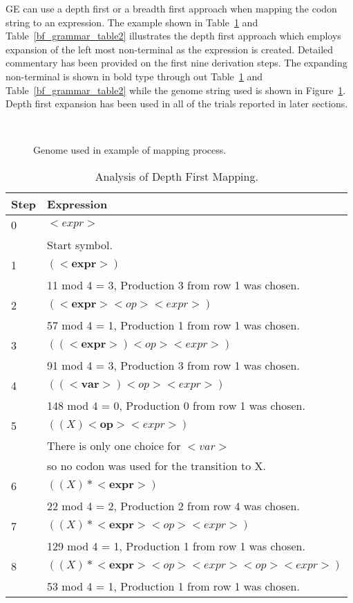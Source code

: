 GE can use a depth first or a breadth first approach when mapping the codon string to an expression. The example shown in Table~\ref{bf_grammar_table1} and Table~\ref{bf_grammar_table2} illustrates the depth first approach which employs expansion of the left most non-terminal as the expression is created. Detailed commentary has been provided on the first nine derivation steps. The expanding non-terminal is shown in bold type through out Table~\ref{bf_grammar_table1} and Table~\ref{bf_grammar_table2} while the genome string used is shown in Figure~\ref{genome1}. Depth first expansion has been used in all of the trials reported in later sections.

\begin{figure}[!hbp]
\centerline{\hbox{
}}
\caption{\label{genome1}Genome used in example of mapping process.}
\end{figure}


\begin{table}[!hbp]
\begin{center}
\begin{tabular}{|l|l|}
\hline
Step & Expression \\
\hline
0 & $ <expr>$ \\ 
  &     Start symbol. \\     
\hline
1 & $ ( \mathbf{<expr>} )$ \\ 
  &    11 mod 4 = 3, Production 3 from row 1 was chosen. \\
\hline
2 & $ ( \mathbf{<expr>} <op> <expr> )$ \\
  &    57 mod 4 = 1, Production 1 from row 1 was chosen. \\
\hline
3 & $ (( \mathbf{<expr>}) <op> <expr> )$  \\
  &    91 mod 4 = 3, Production 3 from row 1 was chosen. \\    
\hline
4 & $ ((\mathbf{<var>}) <op> <expr> )$ \\ 
  &   148 mod 4 = 0, Production 0 from row 1 was chosen. \\
\hline
5 & $ (( X ) \mathbf{<op>} <expr> )$  \\
  & There is only one choice for $<var>$ \\ 
  & so no codon was used for the transition to X. \\
\hline
6 & $ (( X ) * \mathbf{<expr>} )$ \\
  &  22 mod 4 = 2, Production 2 from row 4 was chosen. \\
\hline
7 & $ (( X ) * \mathbf{<expr>} <op> <expr> )$ \\
  &  129 mod 4 = 1, Production 1 from row 1 was chosen. \\ 
\hline
8 & $ (( X ) * \mathbf{<expr>} <op> <expr> <op> <expr> )$ \\
  & 53 mod 4 = 1, Production 1 from row 1 was chosen. \\
\hline
\hline
\end{tabular}
\caption{\label{bf_grammar_table1}Analysis of Depth First Mapping.}
\end{center}
\end{table}

